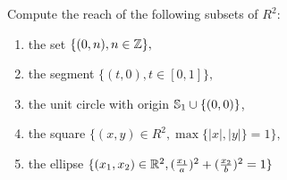\noindent\linia 

\begin{exercise}
    Compute the reach of the following subsets of $R^2$:
    \begin{enumerate}
        \item the set $\{(0, n), n \in \mathbb{Z}\},$
        \item the segment $\{(t, 0), t \in [0, 1]\},$
        \item the unit circle with origin $\mathbb{S}_1 \cup \{(0, 0)\}$,
        \item the square $\{(x, y) \in R^2, \max\{|x|, |y|\}  
        = 1\},$
        \item the ellipse $\{(x_1, x_2) \in \mathbb{R}^2, (\frac{x_1}{a})^2 +
        (\frac{x_2}{b})^2 = 1 \}$
    \end{enumerate}
\end{exercise}

